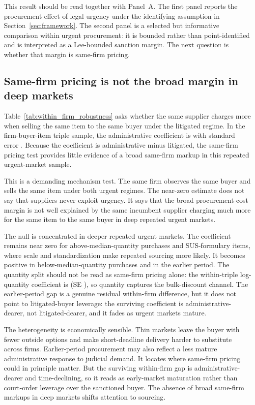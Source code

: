 This result should be read together with Panel~A. The first panel
reports the procurement effect of legal urgency under the identifying
assumption in Section~\ref{sec:framework}. The second panel is a
selected but informative comparison within urgent procurement: it is
bounded rather than point-identified and is interpreted as a
Lee-bounded sanction margin. The next question is whether that margin
is same-firm pricing.

\subsection{Same-firm pricing is not the broad margin in deep markets}
\label{subsec:within_firm}

Table~\ref{tab:within_firm_robustness} asks whether the same supplier
charges more when selling the same item to the same buyer under the
litigated regime. In the firm-buyer-item triple sample, the
administrative coefficient is \BPutgTripleCoefUTG{} with standard
error \BPutgTripleSEUTG{}. Because the coefficient is administrative
minus litigated, the same-firm pricing test provides little evidence
of a broad same-firm markup in this repeated urgent-market sample.



This is a demanding mechanism test. The same firm observes the same
buyer and sells the same item under both urgent regimes. The near-zero
estimate does not say that suppliers never exploit urgency. It says
that the broad procurement-cost margin is not well explained by the
same incumbent supplier charging much more for the same item to the
same buyer in deep repeated urgent markets.

The null is concentrated in deeper repeated urgent markets. The
coefficient remains near zero for above-median-quantity purchases and
SUS-formulary items, where scale and standardization make repeated
sourcing more likely. It becomes positive in below-median-quantity
purchases and in the earlier period. The quantity split should not be
read as same-firm pricing alone: the within-triple log-quantity
coefficient is \BPwfWithinQtyCoef{} (SE \BPwfWithinQtySE{}), so
quantity captures the bulk-discount channel. The earlier-period gap
is a genuine residual within-firm difference, but it does not point to
litigated-buyer leverage: the surviving coefficient is
administrative-dearer, not litigated-dearer, and it fades as urgent
markets mature.

The heterogeneity is economically sensible. Thin markets leave the
buyer with fewer outside options and make short-deadline delivery
harder to substitute across firms. Earlier-period procurement may
also reflect a less mature administrative response to judicial demand.
It locates where same-firm pricing could in principle matter. But the
surviving within-firm gap is administrative-dearer and time-declining,
so it reads as early-market maturation rather than court-order leverage
over the sanctioned buyer. The absence of broad same-firm markups in
deep markets shifts attention to sourcing.

